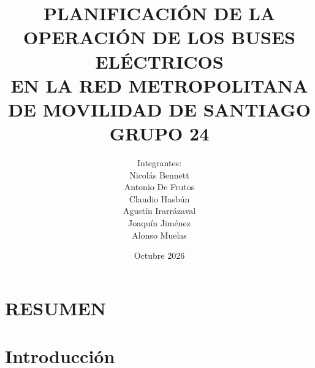 \documentclass[pdftex,spanish]{pucthesis}
\begin{document}
\raggedbottom


\title[PLANIFICACI\'ON DE LA OPERACI\'ON DE LOS BUSES EL\'ECTRICOS\\ EN LA RED METROPOLITANA DE MOVILIDAD DE SANTIAGO\\ GRUPO 24]
   {\bf PLANIFICACI\'ON DE LA OPERACI\'ON DE LOS BUSES EL\'ECTRICOS\\ EN LA RED METROPOLITANA DE MOVILIDAD DE SANTIAGO\\ GRUPO 24}
\author[Integrantes:]{Integrantes:\\
\textnormal{\small{
Nicol\'as Bennett\\
Antonio De Frutos\\
Claudio Hasb\'un\\
Agust\'in Irarr\'azaval\\
Joaqu\'in Jim\'enez\\
Alonso Muelas}
}}

\address{Escuela de Ingenier\'ia\\
                   Pontificia Universidad Cat\'olica de Chile\\
                   Vicu\~na Mackenna 4860\\
                  Santiago, Chile\\
                  {\it Tel.\/} : 56 (2) 354-2000}

\date{Octubre 2026}

\NoChapterPageNumber
{}
{\hfuzz=11pt\maketitle}

\tableofcontents
\listoffigures
\listoftables
\cleardoublepage

 \label{resumen}
\chapter*{RESUMEN}

\cleardoublepage


\chapter[INTRODUCCI\'ON]{Introducci\'on}

\end{document}
